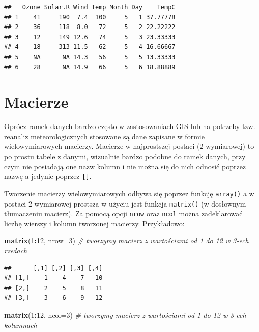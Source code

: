\documentclass[]{book}
\newenvironment{Shaded}{\begin{snugshade}}{\end{snugshade}}
\newcommand{\KeywordTok}[1]{\textcolor[rgb]{0.13,0.29,0.53}{\textbf{#1}}}
\newcommand{\DataTypeTok}[1]{\textcolor[rgb]{0.13,0.29,0.53}{#1}}
\newcommand{\DecValTok}[1]{\textcolor[rgb]{0.00,0.00,0.81}{#1}}
\newcommand{\CommentTok}[1]{\textcolor[rgb]{0.56,0.35,0.01}{\textit{#1}}}
\newcommand{\OperatorTok}[1]{\textcolor[rgb]{0.81,0.36,0.00}{\textbf{#1}}}
\newcommand{\NormalTok}[1]{#1}
\theoremstyle{definition}
\theoremstyle{definition}
\theoremstyle{definition}
\theoremstyle{remark}
\begin{document}
\begin{verbatim}
##   Ozone Solar.R Wind Temp Month Day    TempC
## 1    41     190  7.4  100     5   1 37.77778
## 2    36     118  8.0   72     5   2 22.22222
## 3    12     149 12.6   74     5   3 23.33333
## 4    18     313 11.5   62     5   4 16.66667
## 5    NA      NA 14.3   56     5   5 13.33333
## 6    28      NA 14.9   66     5   6 18.88889
\end{verbatim}

\section{Macierze}\label{macierze}

Oprócz ramek danych bardzo często w zastosowaniach GIS lub na potrzeby
tzw. reanaliz meteorologicznych stosowane są dane zapisane w formie
wielowymiarowych macierzy. Macierze w najprostszej postaci
(2-wymiarowej) to po prostu tabele z danymi, wizualnie bardzo podobne do
ramek danych, przy czym nie posiadają one nazw kolumn i nie można się do
nich odnosić poprzez nazwę a jedynie poprzez \texttt{{[}{]}}.

Tworzenie macierzy wielowymiarowych odbywa się poprzez funkcję
\texttt{array()} a w postaci 2-wymiarowej prostsza w użyciu jest funkcja
\texttt{matrix()} (w dosłownym tłumaczeniu macierz). Za pomocą opcji
\texttt{nrow} oraz \texttt{ncol} można zadeklarować liczbę wierszy i
kolumn tworzonej macierzy. Przykładowo:

\begin{Shaded}
\begin{Highlighting}[]
\KeywordTok{matrix}\NormalTok{(}\DecValTok{1}\OperatorTok{:}\DecValTok{12}\NormalTok{, }\DataTypeTok{nrow=}\DecValTok{3}\NormalTok{) }\CommentTok{# tworzymy macierz z wartościami od 1 do 12 w 3-ech rzedach}
\end{Highlighting}
\end{Shaded}

\begin{verbatim}
##      [,1] [,2] [,3] [,4]
## [1,]    1    4    7   10
## [2,]    2    5    8   11
## [3,]    3    6    9   12
\end{verbatim}

\begin{Shaded}
\begin{Highlighting}[]
\KeywordTok{matrix}\NormalTok{(}\DecValTok{1}\OperatorTok{:}\DecValTok{12}\NormalTok{, }\DataTypeTok{ncol=}\DecValTok{3}\NormalTok{) }\CommentTok{# tworzymy macierz z wartościami od 1 do 12 w 3-ech kolumnach}
\end{Highlighting}
\end{Shaded}
\end{document}
